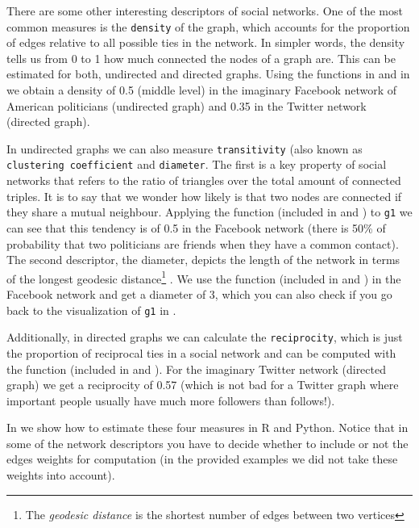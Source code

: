 
There are some other interesting descriptors of social networks. One of the most common measures is the \texttt{density} of the graph, which accounts for the proportion of edges relative to all possible ties in the network. In simpler words, the density tells us from 0 to 1 how much connected the nodes of a graph are. This can be estimated for both, undirected and directed graphs. Using the functions  in  and  in  we obtain a density of 0.5 (middle level) in the imaginary Facebook network of American politicians (undirected graph) and 0.35 in the Twitter network (directed graph). 

In undirected graphs we can also measure \texttt{transitivity} (also known as \texttt{clustering coefficient} and \texttt{diameter}. The first is a key property of social networks that refers to the ratio of triangles over the total amount of connected triples. It is to say that we wonder how likely is that two nodes are connected if they share a mutual neighbour. Applying the function  (included in  and ) to \texttt{g1} we can see that this tendency is of 0.5 in the Facebook network (there is 50\% of probability that two politicians 
are friends when they have a common contact). The second descriptor, the diameter, depicts the length of the network in terms of the longest geodesic distance\footnote{The \textit{geodesic distance} is the shortest number of edges between two vertices} . We use the function  (included in  and ) in the Facebook network and get a diameter of 3, which you can also check if you go back to the visualization of \texttt{g1} in . 

Additionally, in directed graphs we can calculate the \texttt{reciprocity}, which is just the proportion of reciprocal ties in a social network and can be computed with the function  (included in  and ). For the imaginary Twitter network (directed graph) we get a reciprocity of 0.57 (which is not bad for a Twitter graph where important people usually have much more followers than follows!).

In  we show how to estimate these four measures in R and Python. Notice that in some of the network descriptors you have to decide whether to include or not the edges weights for computation (in the provided examples we did not take these weights into account).

